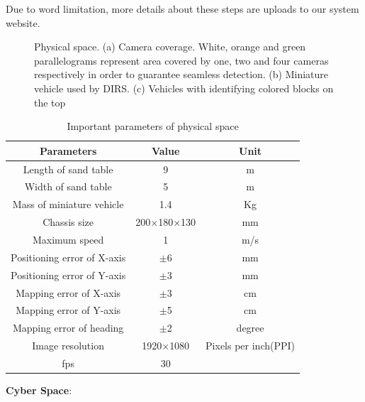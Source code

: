 \documentclass[conference]{IEEEtran}
\begin{document}
	Due to word limitation, more details about these steps are uploads to our system website\cite{ref:website}.
 \begin{figure}[htbp]
 	\begin{centering}
 	\end{centering}
 	\caption {Physical space. (a) Camera coverage.  White, orange and green parallelograms represent area covered by one, two and four cameras respectively in order to guarantee seamless detection. (b) Miniature vehicle used by DIRS. (c) Vehicles with identifying colored blocks on the top}
 \end{figure}
 \begin{table}
 	\centering
 	\caption {Important parameters of physical space}
 	\label {tab:summarize}
 	\begin{tabular}{|c|c|c|}
 		\hline
 		\textbf{Parameters}&\textbf{Value}&\textbf{Unit} \\
 		\hline
 		Length of sand table&9&m\\
 		\hline
 		Width of sand table&5&m\\
 		\hline
 		Mass of miniature vehicle&1.4&Kg\\
 		\hline
 		Chassis size&200$\times$180$\times$130&mm\\
 		\hline
 		Maximum speed&1&m/s\\
 		\hline
 		Positioning error of X-axis&$\pm$6&mm\\
 		\hline
 		Positioning error of Y-axis&$\pm$3&mm\\
 		\hline
 		Mapping error of X-axis&$\pm$3&cm\\
 		\hline
 		Mapping error of Y-axis&$\pm$5&cm\\
 		\hline
 		Mapping error of heading&$\pm$2&degree\\
 		\hline
 		Image resolution&1920$\times$1080&Pixels per inch(PPI)\\
 		\hline
 		fps&30&\\
 		\hline
 	\end{tabular}
 \end{table}	 
 \par\textbf{Cyber Space}:
 
\end{document}
